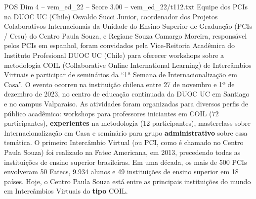 \begin{textsample}{POS Dim 4 – vem\_ed\_22 – Score 3.00 – vem\_ed\_22/t112.txt}  \label{ex:f4_pos_151}
Equipe dos PCIs na DUOC UC (Chile) Osvaldo Succi Junior, coordenador dos Projetos Colaborativos Internacionais da Unidade do Ensino Superior de Graduação (PCIs / Cesu) do Centro Paula Souza, e Regiane Souza Camargo Moreira, responsável pelos PCIs em espanhol, foram convidados pela Vice-Reitoria Acadêmica do Instituto Profesional DUOC UC (Chile) para oferecer workshops sobre a metodologia COIL (Collaborative Online International Learning) de Intercâmbios Virtuais e participar de seminários da “1ª Semana de Internacionalização em Casa”.
O evento ocorreu na instituição chilena entre 27 de novembro e 1º de dezembro de 2023, no centro de educação continuada da DUOC UC em Santiago e no campus Valparaíso.
As atividades foram organizadas para diversos perfis de público acadêmico: workshops para professores iniciantes em COIL (72 participantes), \textbf{experientes} na metodologia (12 participantes), masterclass sobre Internacionalização em Casa e seminário para grupo \textbf{administrativo} sobre essa temática.
O primeiro Intercâmbio Virtual (ou PCI, como é chamado no Centro Paula Souza) foi realizado na Fatec Americana, em 2013, precedendo todas as instituições de ensino superior brasileiras.
Em uma década, os mais de 500 PCIs envolveram 50 Fatecs, 9.934 alunos e 49 instituições de ensino superior em 18 países.
Hoje, o Centro Paula Souza está entre as principais instituições do mundo em Intercâmbios Virtuais do \textbf{tipo} COIL.

\end{textsample}
